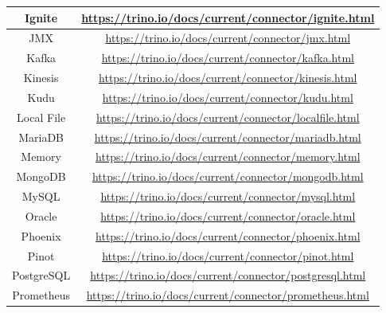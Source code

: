 \begin{table}[ht]
\begin{tabular}{|c|c|}
	Ignite & \href{https://trino.io/docs/current/connector/ignite.html}{https://trino.io/docs/current/connector/ignite.html} \\ \hline
	JMX & \href{https://trino.io/docs/current/connector/jmx.html}{https://trino.io/docs/current/connector/jmx.html} \\ \hline
	Kafka & \href{https://trino.io/docs/current/connector/kafka.html}{https://trino.io/docs/current/connector/kafka.html} \\ \hline
	Kinesis & \href{https://trino.io/docs/current/connector/kinesis.html}{https://trino.io/docs/current/connector/kinesis.html} \\ \hline
	Kudu & \href{https://trino.io/docs/current/connector/kudu.html}{https://trino.io/docs/current/connector/kudu.html} \\ \hline
	Local File & \href{https://trino.io/docs/current/connector/localfile.html}{https://trino.io/docs/current/connector/localfile.html} \\ \hline
	MariaDB & \href{https://trino.io/docs/current/connector/mariadb.html}{https://trino.io/docs/current/connector/mariadb.html} \\ \hline
	Memory & \href{https://trino.io/docs/current/connector/memory.html}{https://trino.io/docs/current/connector/memory.html} \\ \hline
	MongoDB & \href{https://trino.io/docs/current/connector/mongodb.html}{https://trino.io/docs/current/connector/mongodb.html} \\ \hline
	MySQL & \href{https://trino.io/docs/current/connector/mysql.html}{https://trino.io/docs/current/connector/mysql.html} \\ \hline
	Oracle & \href{https://trino.io/docs/current/connector/oracle.html}{https://trino.io/docs/current/connector/oracle.html} \\ \hline
	Phoenix & \href{https://trino.io/docs/current/connector/phoenix.html}{https://trino.io/docs/current/connector/phoenix.html} \\ \hline
	Pinot & \href{https://trino.io/docs/current/connector/pinot.html}{https://trino.io/docs/current/connector/pinot.html} \\ \hline
	PostgreSQL & \href{https://trino.io/docs/current/connector/postgresql.html}{https://trino.io/docs/current/connector/postgresql.html} \\ \hline
	Prometheus & \href{https://trino.io/docs/current/connector/prometheus.html}{https://trino.io/docs/current/connector/prometheus.html} \\ \hline

\end{tabular}
\end{table}
